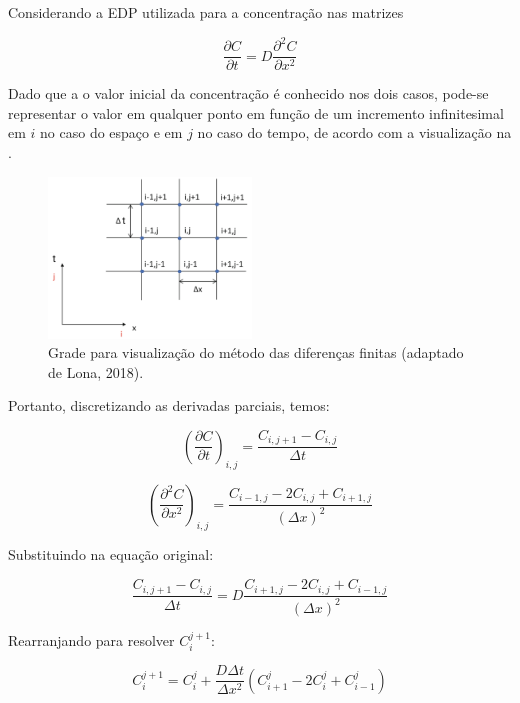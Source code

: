Considerando a EDP utilizada para a concentração nas matrizes

\begin{equation}
    \frac{\partial C}{\partial t} = D \frac{\partial^2 C}{\partial x^2}
\end{equation}

Dado que a o valor inicial da concentração é conhecido nos dois casos, pode-se representar o valor em qualquer ponto em função de um incremento infinitesimal em $i$ no caso do espaço e em $j$ no caso do tempo, de acordo com a visualização na .

\begin{figure}[!htb]
    \centering
        \includegraphics[width=0.48\textwidth]{figuras/grid.png}
        \caption[Grade para visualização do método das diferenças finitas]{Grade para visualização do método das diferenças finitas (adaptado de Lona, 2018).}
    \label{fig:grid}
\end{figure}

Portanto, discretizando as derivadas parciais, temos:

\begin{equation}
    \left( \frac{\partial C}{\partial t} \right)_{i,j} = \frac{C_{i,j+1} - C_{i,j}}{\Delta t}
\end{equation}

\begin{equation}
    \left( \frac{\partial^2 C}{\partial x^2} \right)_{i,j} = \frac{C_{i-1,j} - 2C_{i,j} + C_{i+1,j}}{(\Delta x)^2}
\end{equation}

Substituindo na equação original:

\begin{equation}
    \frac{C_{i,j+1} - C_{i,j}}{\Delta t} = D \frac{C_{i+1,j} - 2C_{i,j} + C_{i-1,j}}{(\Delta x)^2}
\end{equation}

Rearranjando para resolver $C_i^{j+1}$:

\begin{equation}
    C_i^{j+1} = C_i^j + \frac{D \Delta t}{\Delta x^2} (C_{i+1}^j - 2C_i^j + C_{i-1}^j)
\end{equation}

